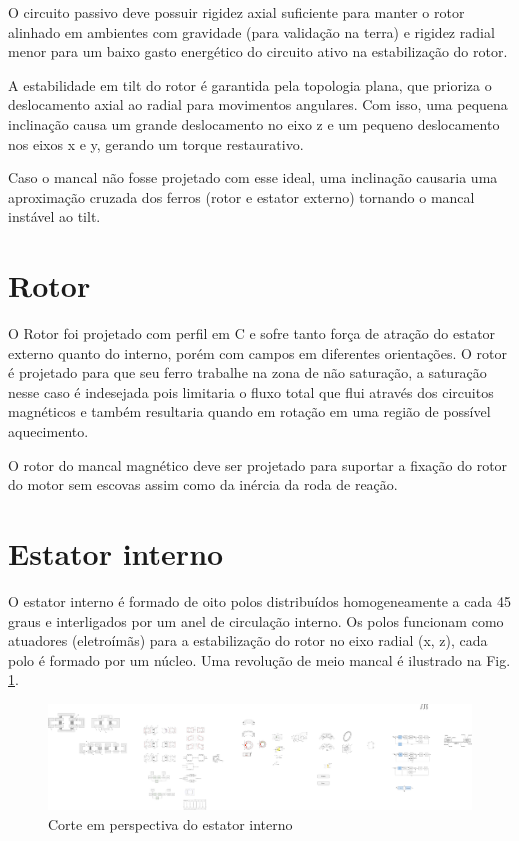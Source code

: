 O circuito passivo deve possuir rigidez axial suficiente para manter o rotor alinhado em ambientes com gravidade (para validação na terra) e rigidez radial menor para um baixo gasto energético do circuito ativo na estabilização do rotor.

A estabilidade em tilt do rotor é garantida pela topologia plana, que prioriza o deslocamento axial ao radial para movimentos angulares. Com isso, uma pequena inclinação causa um grande deslocamento no eixo z e um pequeno deslocamento nos eixos x e y, gerando um torque restaurativo. 

Caso o mancal não fosse projetado com esse ideal, uma inclinação causaria uma aproximação cruzada dos ferros (rotor e estator externo) tornando o mancal instável ao tilt.


\section{Rotor}

O Rotor foi projetado com perfil em C e sofre tanto força de atração do estator externo quanto do interno, porém com campos em diferentes orientações. O rotor é projetado para que seu ferro trabalhe na zona de não saturação, a saturação nesse caso é indesejada pois limitaria o fluxo total que flui através dos circuitos magnéticos e também resultaria quando em rotação em uma região de possível aquecimento.

O rotor do mancal magnético deve ser projetado para suportar a fixação do rotor do motor sem escovas assim como da inércia da roda de reação. 

\section{Estator interno}

O estator interno é formado de oito polos distribuídos homogeneamente a cada 45 graus e interligados por um anel de circulação interno. Os polos funcionam como atuadores (eletroímãs) para a estabilização do rotor no eixo radial (x, z),  cada polo é formado por um núcleo. Uma revolução de meio mancal é ilustrado na Fig. \ref{fig:modelo:mancal:estator:interno}. 

\begin{figure}[ht!]
	\centering
	\includegraphics[width=1\linewidth]{./Figs/modelo_mancal_estator_interno}
	\caption{Corte em perspectiva do estator interno}
	\label{fig:modelo:mancal:estator:interno}
\end{figure}

